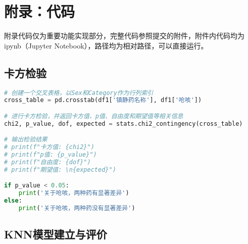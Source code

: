 \section{附录：代码}

附录代码仅为重要功能实现部分，完整代码参照提交的附件，附件内代码均为ipynb（Jupyter Notebook），路径均为相对路径，可以直接运行。

\subsection{卡方检验}

\begin{lstlisting}[language=Python]
# 创建一个交叉表格，以Sex和Category作为行列索引
cross_table = pd.crosstab(df1['镇静药名称'], df1['呛咳'])

# 进行卡方检验，并返回卡方值、p值、自由度和期望值等相关信息
chi2, p_value, dof, expected = stats.chi2_contingency(cross_table)

# 输出检验结果
# print(f"卡方值: {chi2}")
# print(f"p值: {p_value}")
# print(f"自由度: {dof}")
# print(f"期望值: \n{expected}")

if p_value < 0.05:
    print('关于呛咳，两种药有显著差异')
else:
    print('关于呛咳，两种药没有显著差异')
\end{lstlisting}

\subsection{KNN模型建立与评价}

